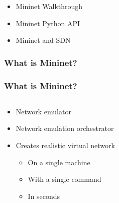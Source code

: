 \documentclass{beamer}
\begin{document}
\begin{frame}[plain]
  \begin{itemize}
  \item[]
    \begin{large}
      Mininet Walkthrough
    \end{large}
    \vspace{1cm}
  \item[] {\color{gray}Mininet Python API }
    \vspace{1cm}
  \item[] {\color{gray}Mininet and SDN}
  \end{itemize}
  \addtocounter{framenumber}{-1}
\end{frame}
\begin{frame}
  \frametitle{What is Mininet?}
\end{frame}

\begin{frame}
  \frametitle{What is Mininet?}
  \begin{columns}
    \begin{column}{0.5\textwidth}
      \begin{itemize}[<+->]
      \item[\ding{219}] Network emulator
      \item[\ding{219}] Network emulation orchestrator
      \item [\ding{219}] Creates realistic virtual network
      \begin{itemize}[<+->] 
      	\item [\ding{219}] On a single machine
      	\item [\ding{219}] With a single command
      	\item [\ding{219}] In seconds
      \end{itemize}
    \end{itemize}
    \end{column}
      \begin{column}{.5\textwidth}
      \end{column}
  \end{columns}
\end{frame}
\end{document}
